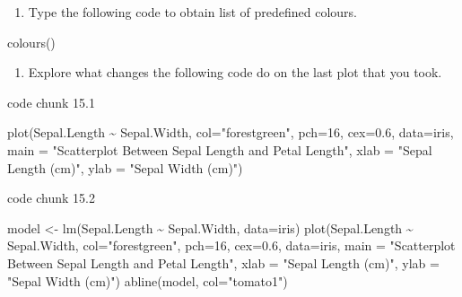 \documentclass[
  letterpaper,
  DIV=11,
  numbers=noendperiod]{scrreprt}
\newenvironment{Shaded}{\begin{snugshade}}{\end{snugshade}}
\newcommand{\AttributeTok}[1]{\textcolor[rgb]{0.40,0.45,0.13}{#1}}
\newcommand{\DecValTok}[1]{\textcolor[rgb]{0.68,0.00,0.00}{#1}}
\newcommand{\FloatTok}[1]{\textcolor[rgb]{0.68,0.00,0.00}{#1}}
\newcommand{\FunctionTok}[1]{\textcolor[rgb]{0.28,0.35,0.67}{#1}}
\newcommand{\NormalTok}[1]{\textcolor[rgb]{0.00,0.23,0.31}{#1}}
\newcommand{\OtherTok}[1]{\textcolor[rgb]{0.00,0.23,0.31}{#1}}
\newcommand{\SpecialCharTok}[1]{\textcolor[rgb]{0.37,0.37,0.37}{#1}}
\newcommand{\StringTok}[1]{\textcolor[rgb]{0.13,0.47,0.30}{#1}}
\providecommand{\tightlist}{%
  \setlength{\itemsep}{0pt}\setlength{\parskip}{0pt}}\usepackage{longtable,booktabs,array}
\begin{document}
\begin{enumerate}
\def\labelenumi{\arabic{enumi}.}
\setcounter{enumi}{13}
\tightlist
\item
  Type the following code to obtain list of predefined colours.
\end{enumerate}

\begin{Shaded}
\begin{Highlighting}[]
\FunctionTok{colours}\NormalTok{()}
\end{Highlighting}
\end{Shaded}

\begin{enumerate}
\def\labelenumi{\arabic{enumi}.}
\setcounter{enumi}{14}
\tightlist
\item
  Explore what changes the following code do on the last plot that you
  took.
\end{enumerate}

code chunk 15.1

\begin{Shaded}
\begin{Highlighting}[]
\FunctionTok{plot}\NormalTok{(Sepal.Length }\SpecialCharTok{\textasciitilde{}}\NormalTok{ Sepal.Width, }\AttributeTok{col=}\StringTok{"forestgreen"}\NormalTok{, }\AttributeTok{pch=}\DecValTok{16}\NormalTok{, }\AttributeTok{cex=}\FloatTok{0.6}\NormalTok{, }\AttributeTok{data=}\NormalTok{iris, }\AttributeTok{main =} \StringTok{"Scatterplot Between Sepal Length and Petal Length"}\NormalTok{,}
     \AttributeTok{xlab =} \StringTok{"Sepal Length (cm)"}\NormalTok{,}
     \AttributeTok{ylab =} \StringTok{"Sepal Width (cm)"}\NormalTok{)}
\end{Highlighting}
\end{Shaded}

code chunk 15.2

\begin{Shaded}
\begin{Highlighting}[]
\NormalTok{model }\OtherTok{\textless{}{-}} \FunctionTok{lm}\NormalTok{(Sepal.Length }\SpecialCharTok{\textasciitilde{}}\NormalTok{ Sepal.Width, }\AttributeTok{data=}\NormalTok{iris)}
\FunctionTok{plot}\NormalTok{(Sepal.Length }\SpecialCharTok{\textasciitilde{}}\NormalTok{ Sepal.Width, }\AttributeTok{col=}\StringTok{"forestgreen"}\NormalTok{, }\AttributeTok{pch=}\DecValTok{16}\NormalTok{, }\AttributeTok{cex=}\FloatTok{0.6}\NormalTok{, }\AttributeTok{data=}\NormalTok{iris, }\AttributeTok{main =} \StringTok{"Scatterplot Between Sepal Length and Petal Length"}\NormalTok{,}
     \AttributeTok{xlab =} \StringTok{"Sepal Length (cm)"}\NormalTok{,}
     \AttributeTok{ylab =} \StringTok{"Sepal Width (cm)"}\NormalTok{)}
\FunctionTok{abline}\NormalTok{(model, }\AttributeTok{col=}\StringTok{"tomato1"}\NormalTok{)}
\end{Highlighting}
\end{Shaded}
\end{document}
